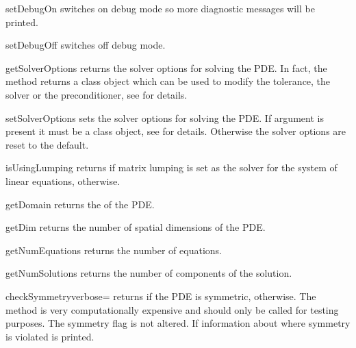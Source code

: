 \begin{methoddesc}[LinearPDE]{setDebugOn}{}
switches on debug mode so more diagnostic messages will be printed.
\end{methoddesc}

\begin{methoddesc}[LinearPDE]{setDebugOff}{}
switches off debug mode.
\end{methoddesc}

\begin{methoddesc}[LinearPDE]{getSolverOptions}{}
returns the solver options for solving the PDE. In fact, the method returns
a \SolverOptions class object which can be used to modify the tolerance,
the solver or the preconditioner, see  for details.
\end{methoddesc}

\begin{methoddesc}[LinearPDE]{setSolverOptions}{}
sets the solver options for solving the PDE. If argument  is
present it must be a \SolverOptions class object, see 
for details. Otherwise the solver options are reset to the default.
\end{methoddesc}

\begin{methoddesc}[LinearPDE]{isUsingLumping}{}
returns \True if matrix lumping is set as the solver for the system of linear
equations, \False otherwise.
\end{methoddesc}

\begin{methoddesc}[LinearPDE]{getDomain}{}
returns the \Domain of the PDE.
\end{methoddesc}

\begin{methoddesc}[LinearPDE]{getDim}{}
returns the number of spatial dimensions of the PDE.
\end{methoddesc}

\begin{methoddesc}[LinearPDE]{getNumEquations}{}
returns the number of equations.
\end{methoddesc}

\begin{methoddesc}[LinearPDE]{getNumSolutions}{}
returns the number of components of the solution.
\end{methoddesc}

\begin{methoddesc}[LinearPDE]{checkSymmetry}{verbose=\False}
returns \True if the PDE is symmetric, \False otherwise.
The method is very computationally expensive and should only be called for
testing purposes. The symmetry flag is not altered.
If  information about where symmetry is violated is printed.
\end{methoddesc}

